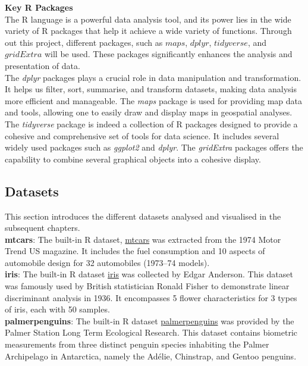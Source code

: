\documentclass{article}\usepackage[]{graphicx}\usepackage[]{xcolor}
\numberwithin{equation}{section}
\begin{document}
\noindent\textbf{Key R Packages}\\
\noindent
The R language is a powerful data analysis tool, and its power lies in the wide variety of R packages that help it achieve a wide variety of functions. Through out this project, different packages, such as $maps$, $dplyr$, $tidyverse$, and $gridExtra$ will be used. These packages significantly enhances the analysis and presentation of data. \\

\noindent
The \textit{dplyr} packages plays a crucial role in data manipulation and transformation. It helps us filter, sort, summarise, and transform datasets, making data analysis more efficient and manageable. The \textit{maps} package is used for providing map data and tools, allowing one to easily draw and display maps in geospatial analyses. The \textit{tidyverse} package is indeed a collection of R packages designed to provide a cohesive and comprehensive set of tools for data science. It includes several widely used packages such as \textit{ggplot2} and \textit{dplyr}. The \textit{gridExtra} packages offers the capability to combine several graphical objects into a cohesive display.\\


\subsection{Datasets}
\noindent
This section introduces the different datasets analysed and visualised in the subsequent chapters.\\

\noindent \textbf{mtcars}: The built-in R dataset, \href{https://www.rdocumentation.org/packages/datasets/versions/3.6.2/topics/mtcars}{mtcars} was extracted from the 1974 Motor Trend US magazine. It includes the fuel consumption and 10 aspects of automobile design for 32 automobiles (1973–74 models). \\

\noindent
\textbf{iris}: The built-in R dataset \href{https://www.rdocumentation.org/packages/datasets/versions/3.6.2/topics/iris}{iris} was collected by Edgar Anderson. This dataset was famously used by British statistician Ronald Fisher to demonstrate linear discriminant analysis in 1936. It encompasses 5 flower characteristics for 3 types of iris, each with 50 samples. \\


\noindent
\textbf{palmerpenguins}: The built-in R dataset \href{https://www.rdocumentation.org/packages/palmerpenguins/versions/0.1.1}{palmerpenguins} was provided by the Palmer Station Long Term Ecological Research. This dataset contains biometric measurements from three distinct penguin species inhabiting the Palmer Archipelago in Antarctica, namely the Adélie, Chinstrap, and Gentoo penguins.\\
\end{document}
